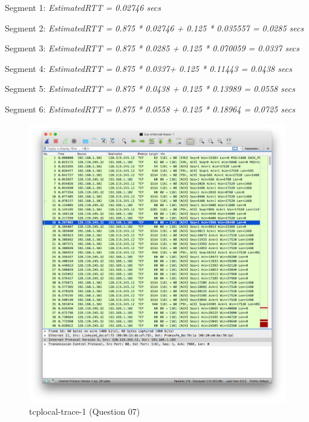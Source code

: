 \documentclass[11pt]{article}
\begin{document}
\begin{itemize}
\par Segment 1: \textit{EstimatedRTT = 0.02746 secs}
\newline

\par Segment 2: \textit{EstimatedRTT = 0.875 * 0.02746 + 0.125 * 0.035557 = 0.0285 secs}
\newline

\par Segment 3: \textit{EstimatedRTT = 0.875 * 0.0285 + 0.125 * 0.070059 = 0.0337 secs}
\newline

\par Segment 4: \textit{EstimatedRTT = 0.875 * 0.0337+ 0.125 * 0.11443 = 0.0438 secs}
\newline

\par Segment 5: \textit{EstimatedRTT = 0.875 * 0.0438 + 0.125 * 0.13989 = 0.0558 secs}
\newline

\par Segment 6: \textit{EstimatedRTT = 0.875 * 0.0558 + 0.125 * 0.18964 = 0.0725 secs}
\newline

		\begin{figure}[H]
		\centering
		\caption{tcplocal-trace-1 (Question 07)}
		\includegraphics[width=\textwidth]{06}
		\end{figure}
		

\end{itemize}
\end{document}
